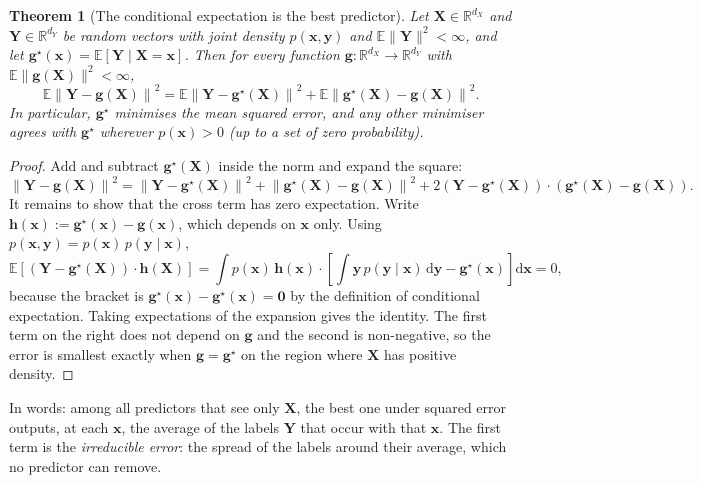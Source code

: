 \documentclass[11pt,a4paper]{article}
\numberwithin{equation}{section}     %
\theoremstyle{plain}        %
\newtheorem{theorem}{Theorem}[section]
\theoremstyle{definition}   %
\theoremstyle{remark}       %
\begin{document}
\begin{theorem}[The conditional expectation is the best predictor]\label{thm:bestpred}
Let $\mathbf{X}\in\mathbb{R}^{d_X}$ and $\mathbf{Y}\in\mathbb{R}^{d_Y}$ be random vectors with joint density $p(\mathbf{x},\mathbf{y})$ and $\mathbb{E}\|\mathbf{Y}\|^2<\infty$, and let $\mathbf{g}^\star(\mathbf{x})=\mathbb{E}[\mathbf{Y}\mid\mathbf{X}=\mathbf{x}]$. Then for every function $\mathbf{g}:\mathbb{R}^{d_X}\to\mathbb{R}^{d_Y}$ with $\mathbb{E}\|\mathbf{g}(\mathbf{X})\|^2<\infty$,
\[
\mathbb{E}\left\|\mathbf{Y}-\mathbf{g}(\mathbf{X})\right\|^2=\mathbb{E}\left\|\mathbf{Y}-\mathbf{g}^\star(\mathbf{X})\right\|^2+\mathbb{E}\left\|\mathbf{g}^\star(\mathbf{X})-\mathbf{g}(\mathbf{X})\right\|^2 .
\]
In particular, $\mathbf{g}^\star$ minimises the mean squared error, and any other minimiser agrees with $\mathbf{g}^\star$ wherever $p(\mathbf{x})>0$ (up to a set of zero probability).
\end{theorem}

\begin{proof}
Add and subtract $\mathbf{g}^\star(\mathbf{X})$ inside the norm and expand the square:
\[
\left\|\mathbf{Y}-\mathbf{g}(\mathbf{X})\right\|^2=\left\|\mathbf{Y}-\mathbf{g}^\star(\mathbf{X})\right\|^2+\left\|\mathbf{g}^\star(\mathbf{X})-\mathbf{g}(\mathbf{X})\right\|^2+2\left(\mathbf{Y}-\mathbf{g}^\star(\mathbf{X})\right)\cdot\left(\mathbf{g}^\star(\mathbf{X})-\mathbf{g}(\mathbf{X})\right).
\]
It remains to show that the cross term has zero expectation. Write $\mathbf{h}(\mathbf{x}):=\mathbf{g}^\star(\mathbf{x})-\mathbf{g}(\mathbf{x})$, which depends on $\mathbf{x}$ only. Using $p(\mathbf{x},\mathbf{y})=p(\mathbf{x})\,p(\mathbf{y}\mid\mathbf{x})$,
\[
\mathbb{E}\left[\left(\mathbf{Y}-\mathbf{g}^\star(\mathbf{X})\right)\cdot\mathbf{h}(\mathbf{X})\right]
=\int p(\mathbf{x})\,\mathbf{h}(\mathbf{x})\cdot\left[\int\mathbf{y}\,p(\mathbf{y}\mid\mathbf{x})\,\mathrm{d}\mathbf{y}-\mathbf{g}^\star(\mathbf{x})\right]\mathrm{d}\mathbf{x}=0,
\]
because the bracket is $\mathbf{g}^\star(\mathbf{x})-\mathbf{g}^\star(\mathbf{x})=\mathbf{0}$ by the definition of conditional expectation. Taking expectations of the expansion gives the identity. The first term on the right does not depend on $\mathbf{g}$ and the second is non-negative, so the error is smallest exactly when $\mathbf{g}=\mathbf{g}^\star$ on the region where $\mathbf{X}$ has positive density.
\end{proof}

In words: among all predictors that see only $\mathbf{X}$, the best one under squared error outputs, at each $\mathbf{x}$, the average of the labels $\mathbf{Y}$ that occur with that $\mathbf{x}$. The first term is the \emph{irreducible error}: the spread of the labels around their average, which no predictor can remove.
\end{document}
